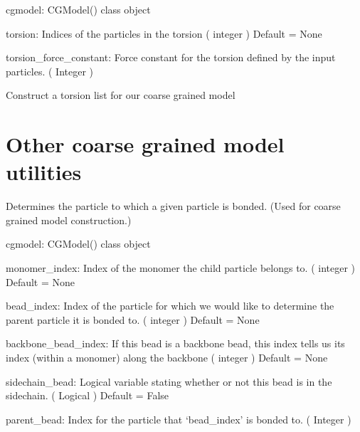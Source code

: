 \documentclass[letterpaper,12pt,english,openany,oneside]{sphinxmanual}
\begin{document}
\begin{fulllineitems}
\begin{fulllineitems}
cgmodel: CGModel() class object

torsion: Indices of the particles in the torsion
( integer )
Default = None

torsion\_force\_constant: Force constant for the torsion defined by the input particles.
( Integer )

\end{fulllineitems}


\begin{fulllineitems}
\label{\detokenize{cg_model:cg_model.cgmodel.CGModel.get_torsion_list}}
Construct a torsion list for our coarse grained model

\end{fulllineitems}


\end{fulllineitems}



\section{Other coarse grained model utilities}
\label{\detokenize{cg_model:module-cg_model.cgmodel}}\label{\detokenize{cg_model:other-coarse-grained-model-utilities}}

\begin{fulllineitems}
\label{\detokenize{cg_model:cg_model.cgmodel.get_parent_bead}}
Determines the particle to which a given particle is bonded.  (Used for coarse grained model construction.)

cgmodel: CGModel() class object

monomer\_index: Index of the monomer the child particle belongs to.
( integer )
Default = None

bead\_index: Index of the particle for which we would like to determine the parent particle it is bonded to.
( integer )
Default = None

backbone\_bead\_index: If this bead is a backbone bead, this index tells us its index (within a monomer) along the backbone
( integer )
Default = None

sidechain\_bead: Logical variable stating whether or not this bead is in the sidechain.
( Logical )
Default = False

parent\_bead: Index for the particle that ‘bead\_index’ is bonded to.
( Integer )

\end{fulllineitems}
\end{document}
